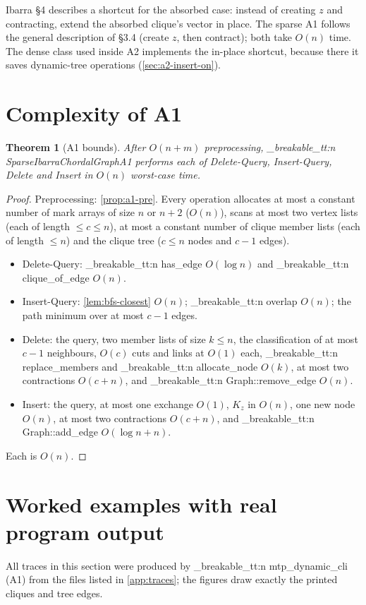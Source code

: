 \documentclass[11pt,a4paper,oneside]{report}
\theoremstyle{plain}
\newtheorem{theorem}{Theorem}[chapter]
\theoremstyle{definition}
\theoremstyle{remark}
\newcommand{\op}[1]{\textsf{#1}}
\DeclareRobustCommand{\code}[1]{\mtp_breakable_tt:n {#1}}
\begin{document}
\begin{remark}
Ibarra \S4 describes a shortcut for the absorbed case: instead of creating \(z\) and
contracting, extend the absorbed clique's vector in place. The sparse A1 follows the general
description of \S3.4 (create \(z\), then contract); both take \(O(n)\) time. The dense class
used inside A2 implements the in-place shortcut, because there it saves dynamic-tree operations
(\cref{sec:a2-insert-on}).
\end{remark}

\section{Complexity of A1}\label{sec:a1-complexity}
\begin{theorem}[A1 bounds]\label{thm:a1-bounds}
After \(O(n+m)\) preprocessing, \code{SparseIbarraChordalGraphA1} performs each of
\op{Delete-Query}, \op{Insert-Query}, \op{Delete} and \op{Insert} in \(O(n)\) worst-case time.
\end{theorem}
\begin{proof}
Preprocessing: \cref{prop:a1-pre}. Every operation allocates at most a constant number of mark
arrays of size \(n\) or \(n+2\) (\(O(n)\)), scans at most two vertex lists (each of length
\(\le c\le n\)), at most a constant number of clique member lists (each of length \(\le n\)) and
the clique tree (\(c\le n\) nodes and \(c-1\) edges).
\begin{itemize}
\item \op{Delete-Query}: \code{has_edge} \(O(\log n)\) and \code{clique_of_edge} \(O(n)\).
\item \op{Insert-Query}: \cref{lem:bfs-closest} \(O(n)\); \code{overlap} \(O(n)\); the path
  minimum over at most \(c-1\) edges.
\item \op{Delete}: the query, two member lists of size \(k\le n\), the classification of at
  most \(c-1\) neighbours, \(O(c)\) cuts and links at \(O(1)\) each, \code{replace_members} and
  \code{allocate_node} \(O(k)\), at most two contractions \(O(c+n)\), and
  \code{Graph::remove_edge} \(O(n)\).
\item \op{Insert}: the query, at most one exchange \(O(1)\), \(K_z\) in \(O(n)\), one new node
  \(O(n)\), at most two contractions \(O(c+n)\), and \code{Graph::add_edge}
  \(O(\log n+n)\).
\end{itemize}
Each is \(O(n)\).
\end{proof}

\section{Worked examples with real program output}\label{sec:a1-traces}
All traces in this section were produced by \code{mtp_dynamic_cli} (A1) from the files listed
in \cref{app:traces}; the figures draw exactly the printed cliques and tree edges.
\end{document}
